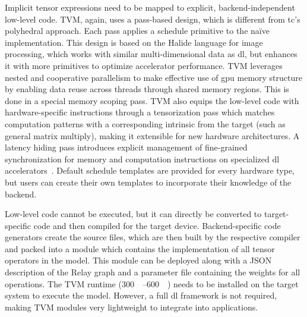 Implicit tensor expressions need to be mapped to explicit, backend-independent low-level code. TVM, again, uses a pass-based design, which is different from \gls{tc}'s polyhedral approach. Each pass applies a schedule primitive to the naïve implementation. This design is based on the Halide language for image processing, which works with similar multi-dimensional data as \gls{dl}, but enhances it with more primitives to optimize accelerator performance. TVM leverages nested and cooperative parallelism to make effective use of \gls{gpu} memory structure by enabling data reuse across threads through shared memory regions. This is done in a special memory scoping pass. TVM also equips the low-level code with hardware-specific instructions through a tensorization pass which matches computation patterns with a corresponding intrinsic from the target (such as general matrix multiply), making it extensible for new hardware architectures. A latency hiding pass introduces explicit management of fine-grained synchronization for memory and computation instructions on specialized \gls{dl} accelerators~\cite[p.~5~f.]{Chen.2018b}. Default schedule templates are provided for every hardware type, but users can create their own templates to incorporate their knowledge of the backend.

Low-level code cannot be executed, but it can directly be converted to target-specific code and then compiled for the target device. Backend-specific code generators create the source files, which are then built by the respective compiler and packed into a module which contains the implementation of all tensor operators in the model. This module can be deployed along with a JSON description of the Relay graph and a parameter file containing the weights for all operations. The TVM runtime (\SIrange{300}{600}{\kilo\byte}) needs to be installed on the target system to execute the model. However, a full \gls{dl} framework is not required, making TVM modules very lightweight to integrate into applications.

